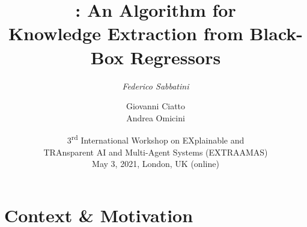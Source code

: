 \documentclass[presentation]{beamer}
\title[\gridex]{
	\gridex: An Algorithm for
	\\
	Knowledge Extraction from Black-Box Regressors
}
\author[F. Sabbatini et al.]{
	\emph{Federico Sabbatini} %
	\and 
	Giovanni Ciatto
	\\
	Andrea Omicini
}
\institute[UniBo]{
    Dipartimento di Informatica -- Scienza e Ingegneria (DISI)
    \\
    \textsc{Alma Mater Studiorum} -- Università di Bologna
    \\
    \texttt{
        \{\emph{f.sabbatini}, giovanni.ciatto, andrea.omicini\}@unibo.it %
    }
}
\date[EXTRAAMAS, 2021]{
	3\textsuperscript{rd} International Workshop on EXplainable and
	\\
	TRAnsparent AI and Multi-Agent Systems (EXTRAAMAS)
	\\
	May 3, 2021, London, UK (online)
}
\begin{document}

\frame{\titlepage}

\section{Context \& Motivation} 
\end{document}
